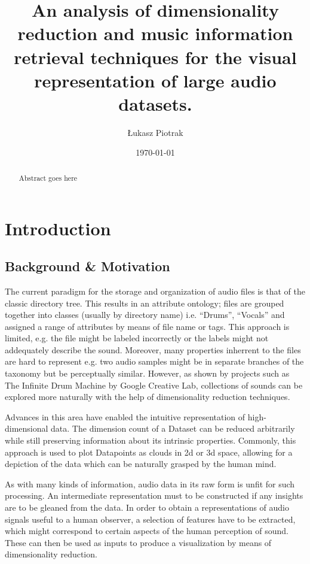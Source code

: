 \documentclass[11pt]{article}
\author{Łukasz Piotrak}
\date{\today}
\title{An analysis of dimensionality reduction and music information retrieval techniques for the visual representation of large audio datasets.}
\begin{document}
\maketitle
\tableofcontents

\begin{abstract}
Abstract goes here
\end{abstract}

\section{Introduction}
\label{sec:org6dce8a9}
\subsection{Background \& Motivation}
\label{sec:orge77a0b6}
The current paradigm for the storage and organization of audio files is that of the classic directory tree. This results in an attribute ontology; files are grouped together into classes (usually by directory name) i.e. ``Drums'', ``Vocals'' and assigned a range of attributes by means of file name or tags. This approach is limited, e.g. the file might be labeled incorrectly or the labels might not addequately describe the sound. Moreover, many properties inherrent to the files are hard to represent e.g. two audio samples might be in separate branches of the taxonomy but be perceptually similar. However, as shown by projects such as The Infinite Drum Machine by Google Creative Lab, collections of sounds can be explored more naturally with the help of dimensionality reduction techniques.

Advances in this area have enabled the intuitive representation of high-dimensional data. The dimension count of a Dataset can be reduced arbitrarily while still preserving information about its intrinsic properties. Commonly, this approach is used to plot Datapoints as clouds in 2d or 3d space, allowing for a depiction of the data which can be naturally grasped by the human mind.

As with many kinds of information, audio data in its raw form is unfit for such processing. An intermediate representation must to be constructed if any insights are to be gleaned from the data. In order to obtain a representations of audio signals useful to a human observer, a selection of features have to be extracted, which might correspond to certain aspects of the human perception of sound. These can then be used as inputs to produce a visualization by means of dimensionality reduction.
\end{document}
